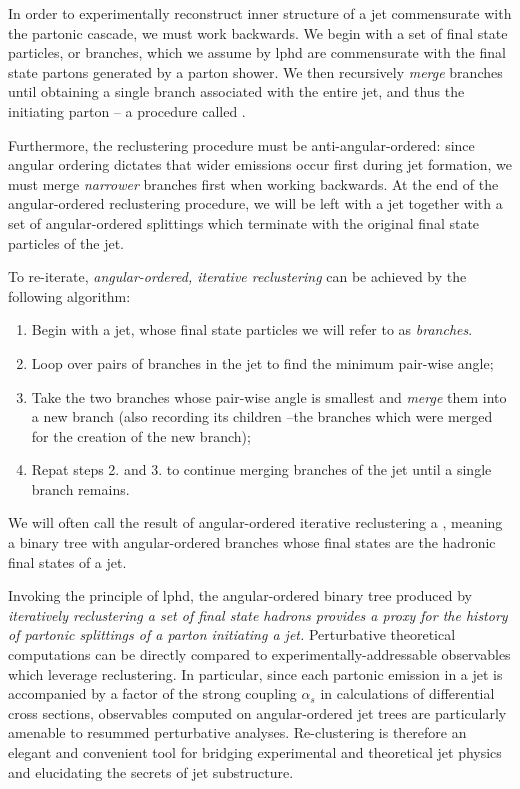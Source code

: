 In order to experimentally reconstruct inner structure of a jet commensurate with the partonic cascade, we must work backwards.
%
We begin with a set of final state particles, or branches, which we assume by \gls{lphd} are commensurate with the final state partons generated by a parton shower.
%
We then recursively \textit{merge} branches until obtaining a single branch associated with the entire jet, and thus the initiating parton -- a procedure called .



Furthermore, the \gls{reclustering} procedure must be anti-angular-ordered:
%
since angular ordering dictates that wider emissions occur first during jet formation, we must merge \textit{narrower} branches first when working backwards.
%
At the end of the angular-ordered \gls{reclustering} procedure, we will be left with a jet together with a set of angular-ordered splittings which terminate with the original final state particles of the jet.


To re-iterate, \textit{angular-ordered, iterative \gls{reclustering}} can be achieved by the following algorithm:
\begin{enumerate}
    \item
    Begin with a jet, whose final state particles we will refer to as \emph{branches}.

    \item
    Loop over pairs of branches in the jet to find the minimum pair-wise angle;

    \item
    Take the two branches whose pair-wise angle is smallest and \emph{merge} them into a new branch (also recording its children --the branches which were merged for the creation of the new branch);

    \item
    Repat steps 2. and 3. to continue merging branches of the jet until a single branch remains.
\end{enumerate}
%
We will often call the result of angular-ordered iterative \gls{reclustering} a , meaning a binary tree with angular-ordered branches whose final states are the hadronic final states of a jet.


Invoking the principle of \gls{lphd}, the angular-ordered binary tree produced by \textit{iteratively \gls{reclustering} a set of final state hadrons provides a proxy for the history of partonic splittings of a parton initiating a jet.}
%
Perturbative theoretical computations can be directly compared to experimentally-addressable observables which leverage \gls{reclustering}.
%
In particular, since each partonic emission in a jet is accompanied by a factor of the strong coupling \(\alpha_s\) in calculations of differential cross sections, observables computed on angular-ordered jet trees are particularly amenable to resummed perturbative analyses.
%
Re-clustering is therefore an elegant and convenient tool for bridging experimental and theoretical jet physics and elucidating the secrets of jet substructure.




